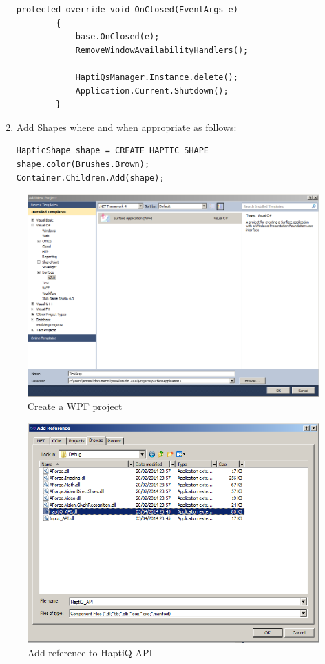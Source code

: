 \documentclass[a4paper]{article}
\begin{document}
\begin{enumerate}
\lstset{style=sharpc1}
\begin{lstlisting}
protected override void OnClosed(EventArgs e)
        {
            base.OnClosed(e);
            RemoveWindowAvailabilityHandlers();

            HaptiQsManager.Instance.delete();
            Application.Current.Shutdown();
        }
\end{lstlisting}

\item Add Shapes where and when appropriate as follows:
\lstset{style=sharpc1}
\begin{lstlisting}
HapticShape shape = CREATE HAPTIC SHAPE
shape.color(Brushes.Brown);
Container.Children.Add(shape);
\end{lstlisting}

\end{enumerate}
 

\begin{figure}[H]
  \centering
  \includegraphics[width=1.0\textwidth]{createProj.png}
  \caption{Create a WPF project}
  \label{fig:createProj}
\end{figure}

\begin{figure}[H]
  \centering
  \includegraphics[width=1.0\textwidth]{addreference.png}
  \caption{Add reference to HaptiQ API}
  \label{fig:addref}
\end{figure}
\end{document}
